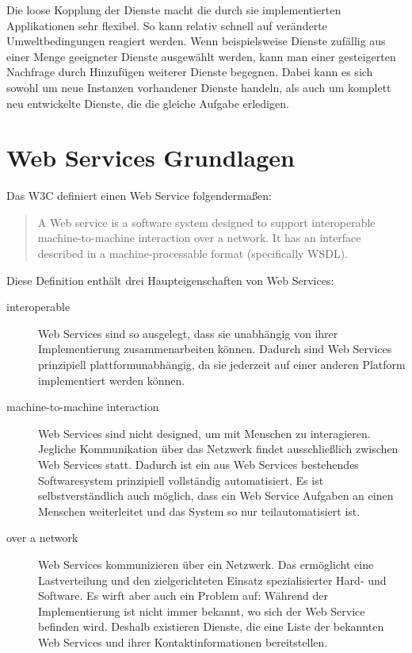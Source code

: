\documentclass[runningheads]{llncs}
\newcommand{\germanquote}[1]{\glqq{}#1\grqq{}}
\begin{document}
    Die loose Kopplung der Dienste macht die durch sie implementierten Applikationen sehr flexibel.
    So kann relativ schnell auf veränderte Umweltbedingungen reagiert werden. Wenn beispielsweise
    Dienste zufällig aus einer Menge geeigneter Dienste ausgewählt werden, kann man einer
    gesteigerten Nachfrage durch Hinzufügen weiterer Dienste begegnen. Dabei kann es sich sowohl um
    neue Instanzen vorhandener Dienste handeln, als auch um komplett neu entwickelte Dienste, die
    die gleiche Aufgabe erledigen.


  \label{ws}
  \section{Web Services Grundlagen}
  \nocite{wk_ws}
    Das W3C definiert einen \germanquote{Web Service} folgendermaßen:
    \begin{quote}
      A Web service is a software system designed to support interoperable machine-to-machine interaction
      over a network. It has an interface described in a machine-processable format (specifically
      WSDL).\cite{w3c_wsgloss_ws}
    \end{quote}

    Diese Definition enthält drei Haupteigenschaften von Web Services:
    \begin{description}
      \item[interoperable]
        Web Services sind so ausgelegt, dass sie unabhängig von ihrer Implementierung
        zusammenarbeiten können. Dadurch sind Web Services prinzipiell plattformunabhängig, da sie
        jederzeit auf einer anderen Platform implementiert werden können.
      \item[machine-to-machine interaction]
        Web Services sind nicht designed, um mit Menschen zu interagieren. Jegliche Kommunikation
        über das Netzwerk findet ausschließlich zwischen Web Services statt. Dadurch ist ein aus
        Web Services bestehendes Softwaresystem prinzipiell vollständig automatisiert. Es ist
        selbstverständlich auch möglich, dass ein Web Service Aufgaben an einen Menschen
        weiterleitet und das System so nur teilautomatisiert ist.
      \item[over a network]
        Web Services kommunizieren über ein Netzwerk. Das ermöglicht eine Lastverteilung und den
        zielgerichteten Einsatz spezialisierter Hard- und Software. Es wirft aber auch ein Problem
        auf: Während der Implementierung ist nicht immer bekannt, wo sich der Web Service befinden
        wird. Deshalb existieren Dienste, die eine Liste der bekannten Web Services und ihrer
        Kontaktinformationen bereitstellen.
    \end{description}
\end{document}
